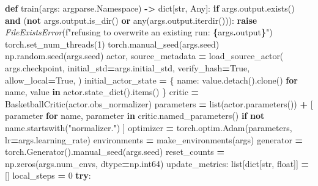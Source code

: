 \documentclass[
  american,
  11pt,
  letterpaper,
]{article}
\newenvironment{Shaded}{\begin{snugshade}}{\end{snugshade}}
\newcommand{\BuiltInTok}[1]{#1}
\newcommand{\ControlFlowTok}[1]{\textcolor[rgb]{0.13,0.29,0.53}{\textbf{#1}}}
\newcommand{\DecValTok}[1]{\textcolor[rgb]{0.00,0.00,0.81}{#1}}
\newcommand{\KeywordTok}[1]{\textcolor[rgb]{0.13,0.29,0.53}{\textbf{#1}}}
\newcommand{\NormalTok}[1]{#1}
\newcommand{\OperatorTok}[1]{\textcolor[rgb]{0.81,0.36,0.00}{\textbf{#1}}}
\newcommand{\PreprocessorTok}[1]{\textcolor[rgb]{0.56,0.35,0.01}{\textit{#1}}}
\newcommand{\SpecialCharTok}[1]{\textcolor[rgb]{0.81,0.36,0.00}{\textbf{#1}}}
\newcommand{\SpecialStringTok}[1]{\textcolor[rgb]{0.31,0.60,0.02}{#1}}
\newcommand{\StringTok}[1]{\textcolor[rgb]{0.31,0.60,0.02}{#1}}
\newcommand{\VariableTok}[1]{\textcolor[rgb]{0.00,0.00,0.00}{#1}}
\renewenvironment{Shaded}{\par\smallskip}{\par\smallskip}
\begin{document}
\begin{Shaded}
\begin{Highlighting}[]
\KeywordTok{def}\NormalTok{ train(args: argparse.Namespace) }\OperatorTok{{-}\textgreater{}} \BuiltInTok{dict}\NormalTok{[}\BuiltInTok{str}\NormalTok{, Any]:}
    \ControlFlowTok{if}\NormalTok{ args.output.exists() }\KeywordTok{and}\NormalTok{ (}\KeywordTok{not}\NormalTok{ args.output.is\_dir() }\KeywordTok{or} \BuiltInTok{any}\NormalTok{(args.output.iterdir())):}
        \ControlFlowTok{raise} \PreprocessorTok{FileExistsError}\NormalTok{(}\SpecialStringTok{f"refusing to overwrite an existing run: }\SpecialCharTok{\{}\NormalTok{args}\SpecialCharTok{.}\NormalTok{output}\SpecialCharTok{\}}\SpecialStringTok{"}\NormalTok{)}
\NormalTok{    torch.set\_num\_threads(}\DecValTok{1}\NormalTok{)}
\NormalTok{    torch.manual\_seed(args.seed)}
\NormalTok{    np.random.seed(args.seed)}
\NormalTok{    actor, source\_metadata }\OperatorTok{=}\NormalTok{ load\_source\_actor(}
\NormalTok{        args.checkpoint,}
\NormalTok{        initial\_std}\OperatorTok{=}\NormalTok{args.initial\_std,}
\NormalTok{        verify\_hash}\OperatorTok{=}\VariableTok{True}\NormalTok{,}
\NormalTok{        allow\_local}\OperatorTok{=}\VariableTok{True}\NormalTok{,}
\NormalTok{    )}
\NormalTok{    initial\_actor\_state }\OperatorTok{=}\NormalTok{ \{}
\NormalTok{        name: value.detach().clone() }\ControlFlowTok{for}\NormalTok{ name, value }\KeywordTok{in}\NormalTok{ actor.state\_dict().items()}
\NormalTok{    \}}
\NormalTok{    critic }\OperatorTok{=}\NormalTok{ BasketballCritic(actor.obs\_normalizer)}
\NormalTok{    parameters }\OperatorTok{=} \BuiltInTok{list}\NormalTok{(actor.parameters()) }\OperatorTok{+}\NormalTok{ [}
\NormalTok{        parameter}
        \ControlFlowTok{for}\NormalTok{ name, parameter }\KeywordTok{in}\NormalTok{ critic.named\_parameters()}
        \ControlFlowTok{if} \KeywordTok{not}\NormalTok{ name.startswith(}\StringTok{"normalizer."}\NormalTok{)}
\NormalTok{    ]}
\NormalTok{    optimizer }\OperatorTok{=}\NormalTok{ torch.optim.Adam(parameters, lr}\OperatorTok{=}\NormalTok{args.learning\_rate)}
\NormalTok{    environments }\OperatorTok{=}\NormalTok{ make\_environments(args)}
\NormalTok{    generator }\OperatorTok{=}\NormalTok{ torch.Generator().manual\_seed(args.seed)}
\NormalTok{    reset\_counts }\OperatorTok{=}\NormalTok{ np.zeros(args.num\_envs, dtype}\OperatorTok{=}\NormalTok{np.int64)}
\NormalTok{    update\_metrics: }\BuiltInTok{list}\NormalTok{[}\BuiltInTok{dict}\NormalTok{[}\BuiltInTok{str}\NormalTok{, }\BuiltInTok{float}\NormalTok{]] }\OperatorTok{=}\NormalTok{ []}
\NormalTok{    local\_steps }\OperatorTok{=} \DecValTok{0}
    \ControlFlowTok{try}\NormalTok{:}

\end{Highlighting}
\end{Shaded}
\end{document}
